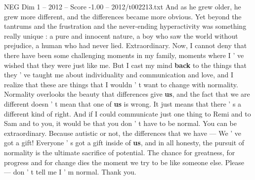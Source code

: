 \begin{textsample}{NEG Dim 1 – 2012 – Score -1.00 – 2012/t002213.txt}
And as he grew older, he grew more different, and the differences became more obvious.
Yet beyond the tantrums and the frustration and the never-ending hyperactivity was something really unique : a pure and innocent nature, a boy who saw the world without prejudice, a human who had never lied.
Extraordinary.
Now, I cannot deny that there have been some challenging moments in my family, moments where I ' ve wished that they were just like me.
But I cast my mind \textbf{back} to the things that they ' ve taught me about individuality and communication and love, and I realize that these are things that I wouldn ' t want to change with normality.
Normality overlooks the beauty that differences give \textbf{us}, and the fact that we are different doesn ' t mean that one of \textbf{us} is wrong.
It just means that there ' s a different kind of right.
And if I could communicate just one thing to Remi and to Sam and to you, it would be that you don ' t have to be normal.
You can be extraordinary.
Because autistic or not, the differences that we have — We ' ve got a gift!
Everyone ' s got a gift inside of \textbf{us}, and in all honesty, the pursuit of normality is the ultimate sacrifice of potential.
The chance for greatness, for progress and for change dies the moment we try to be like someone else.
Please — don ' t tell me I ' m normal.
Thank you.

\end{textsample}
